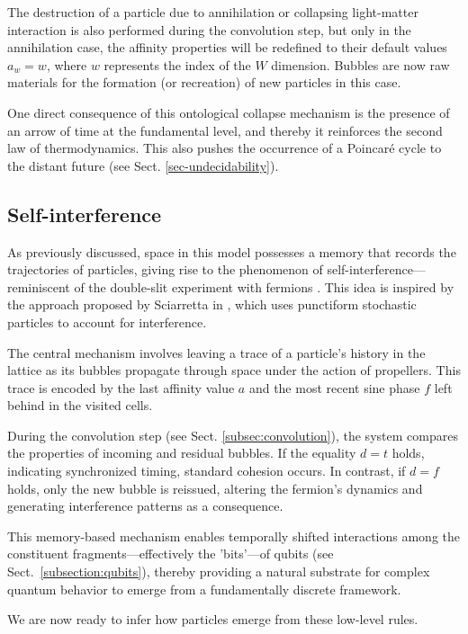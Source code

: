 \documentclass[12pt,english]{article}
\begin{document}
The destruction of a particle due to annihilation or collapsing light-matter interaction is also performed during the convolution step, but only in the annihilation case, the affinity properties will be redefined to their default values $a_w=w$, where $w$ represents the index of the $W$ dimension. Bubbles are now raw materials for the formation (or recreation) of new particles in this case.

One direct consequence of this ontological collapse mechanism is the presence of an arrow of time at the fundamental level, and thereby it reinforces the second law of thermodynamics. This also pushes the occurrence of a Poincaré cycle to the distant future (see Sect. \ref{sec-undecidability}).

\subsection{Self-interference\label{subsec:Interference}}

As previously discussed, space in this model possesses a memory that records the trajectories of particles, giving rise to the phenomenon of self-interference—reminiscent of the double-slit experiment with fermions \cite{feynman-2}. This idea is inspired by the approach proposed by Sciarretta in \cite{sciarretta}, which uses punctiform stochastic particles to account for interference.

The central mechanism involves leaving a trace of a particle’s history in the lattice as its bubbles propagate through space under the action of propellers. This trace is encoded by the last affinity value $a$ and the most recent sine phase $f$ left behind in the visited cells.

During the convolution step (see Sect. \ref{subsec:convolution}), the system compares the properties of incoming and residual bubbles. If the equality $d = t$ holds, indicating synchronized timing, standard cohesion occurs. In contrast, if $d=f$ holds, only the new bubble is reissued, altering the fermion’s dynamics and generating interference patterns as a consequence.

This memory-based mechanism enables temporally shifted interactions among the constituent fragments—effectively the 'bits'—of qubits (see Sect.~\ref{subsection:qubits}), thereby providing a natural substrate for complex quantum behavior to emerge from a fundamentally discrete framework.

We are now ready to infer how particles emerge from these low-level rules.
\end{document}

